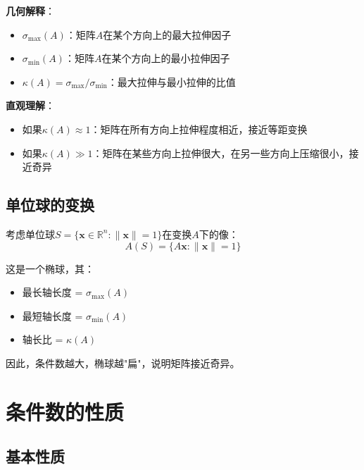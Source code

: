 \documentclass[12pt,a4paper]{article}
\begin{document}
\textbf{几何解释}：
\begin{itemize}
\item $\sigma_{\max}(A)$：矩阵$A$在某个方向上的最大拉伸因子
\item $\sigma_{\min}(A)$：矩阵$A$在某个方向上的最小拉伸因子
\item $\kappa(A) = \sigma_{\max}/\sigma_{\min}$：最大拉伸与最小拉伸的比值
\end{itemize}

\textbf{直观理解}：
\begin{itemize}
\item 如果$\kappa(A) \approx 1$：矩阵在所有方向上拉伸程度相近，接近等距变换
\item 如果$\kappa(A) \gg 1$：矩阵在某些方向上拉伸很大，在另一些方向上压缩很小，接近奇异
\end{itemize}

\subsection{单位球的变换}

考虑单位球$S = \{\bm{x} \in \mathbb{R}^n : \|\bm{x}\| = 1\}$在变换$A$下的像：
\begin{equation}
A(S) = \{A\bm{x} : \|\bm{x}\| = 1\}
\end{equation}

这是一个椭球，其：
\begin{itemize}
\item 最长轴长度 = $\sigma_{\max}(A)$
\item 最短轴长度 = $\sigma_{\min}(A)$
\item 轴长比 = $\kappa(A)$
\end{itemize}

因此，条件数越大，椭球越"扁"，说明矩阵接近奇异。

\section{条件数的性质}

\subsection{基本性质}
\end{document}
